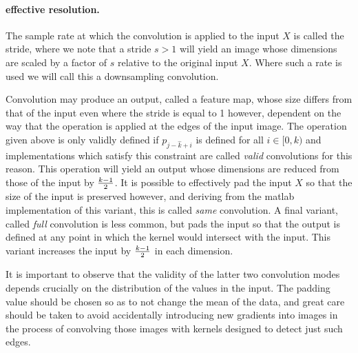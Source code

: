 \documentclass[msc]{infthesis}
\begin{document}
\paragraph*{effective resolution.}
%
The sample rate at which the convolution is applied to the input \(X\) is called the stride,
where we note that a stride \(s > 1\) will yield an image whose dimensions are scaled by a
factor of \(s\) relative to the original input \(X\).  Where such a rate is used we will call
this a downsampling convolution.

Convolution may produce an output, called a feature map, whose size differs from that of the
input even where the stride is equal to 1 however, dependent on the way that the operation is
applied at the edges of the input image.  The operation given above is only validly defined if
\(p_{j - \hat{k} + i}\) is defined for all \(i \in [0, k)\) and implementations which satisfy
this constraint are called \emph{valid} convolutions for this reason.  This operation will yield
an output whose dimensions are reduced from those of the input by \({k-1 \over 2}\).  It is
possible to effectively pad the input \(X\) so that the size of the input is preserved however,
and deriving from the matlab implementation of this variant, this is called \emph{same}
convolution.  A final variant, called \emph{full} convolution is less common, but pads the input
so that the output is defined at any point in which the kernel would intersect with the input.
This variant increases the input by \({k-1 \over 2}\) in each dimension.

It is important to observe that the validity of the latter two convolution modes depends crucially
on the distribution of the values in the input.  The padding value should be chosen so as to not
change the mean of the data, and great care should be taken to avoid accidentally introducing new
gradients into images in the process of convolving those images with kernels designed to detect
just such edges.
\end{document}
